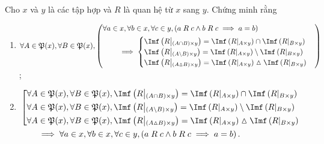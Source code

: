  Cho $x$ và $y$ là các tập hợp và $R$ là quan hệ từ $x$ sang $y$. Chứng minh rằng 
\begin{enumerate}
   \item $\forall A \in \mathfrak{P}(x), \forall B \in \mathfrak{P}(x), \left(\begin{aligned}
      &\forall a \in x, \forall b \in x, \forall c \in y, \left(a\;R\;c \land b\;R\;c \implies a = b\right) \\
      &\qquad\implies \begin{cases}
         \Imf\left(R\middle|_{(A \cap B) \times y}\right) = \Imf\left(R\middle|_{A \times y}\right) \cap \Imf\left(R\middle|_{B \times y}\right) \\
         \Imf\left(R\middle|_{(A \setminus B) \times y}\right) = \Imf\left(R\middle|_{A \times y}\right) \setminus \Imf\left(R\middle|_{B \times y}\right) \\
         \Imf\left(R\middle|_{(A \vartriangle B) \times y}\right) = \Imf\left(R\middle|_{A \times y}\right) \vartriangle \Imf\left(R\middle|_{B \times y}\right)
      \end{cases}
   \end{aligned}\right)$; 
   \item $\begin{aligned}[t]
      &\left[\begin{aligned}
         &\forall A \in \mathfrak{P}(x), \forall B \in \mathfrak{P}(x), \Imf\left(R\middle|_{(A \cap B) \times y}\right) = \Imf\left(R\middle|_{A \times y}\right) \cap \Imf\left(R\middle|_{B \times y}\right) \\
         &\forall A \in \mathfrak{P}(x), \forall B \in \mathfrak{P}(x), \Imf\left(R\middle|_{(A \setminus B) \times y}\right) = \Imf\left(R\middle|_{A \times y}\right) \setminus \Imf\left(R\middle|_{B \times y}\right) \\
         &\forall A \in \mathfrak{P}(x), \forall B \in \mathfrak{P}(x), \Imf\left(R\middle|_{(A \vartriangle B) \times y}\right) = \Imf\left(R\middle|_{A \times y}\right) \vartriangle \Imf\left(R\middle|_{B \times y}\right)
      \end{aligned}\right. \\
      &\qquad \implies \forall a \in x, \forall b \in x, \forall c \in y, \left(a\;R\;c \land b\;R\;c \implies a = b\right).
   \end{aligned}$
\end{enumerate}



